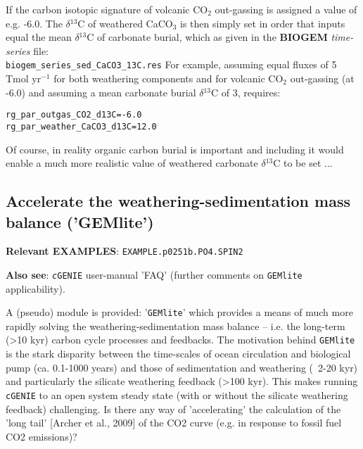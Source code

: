 \documentclass[10pt,twoside]{article}
\begin{document}
If the carbon isotopic signature of volcanic CO$_{2}$ out-gassing is assigned a value of e.g. -6.0\permil. The $\delta$$^{13}$C of weathered CaCO$_{3}$ is then simply set in order that inputs equal the mean $\delta$$^{13}$C of carbonate burial, which as given in the \textbf{BIOGEM} \textit{time-series} file:
\\\texttt{biogem\_series\_sed\_CaCO3\_13C.res}
For example, assuming equal fluxes of 5 Tmol yr$^{-1}$ for both weathering components and for volcanic CO$_{2}$ out-gassing (at -6.0\permil) and assuming a mean carbonate burial $\delta$$^{13}$C of 3\permil, requires:
\vspace{-10pt}\begin{verbatim}
rg_par_outgas_CO2_d13C=-6.0
rg_par_weather_CaCO3_d13C=12.0
\end{verbatim}\vspace{-10pt}
Of course, in reality organic carbon burial is important and including it would enable a much more realistic value of weathered carbonate $\delta$$^{13}$C to be set ...


\subsection{Accelerate the weathering-sedimentation mass balance ('GEMlite')}\label{GEMlite}

\noindent \textbf{Relevant EXAMPLES}: \texttt{EXAMPLE.p0251b.PO4.SPIN2}

\noindent \textbf{Also see}: \texttt{\textit{c}GENIE} user-manual 'FAQ' (further comments on \texttt{GEMlite} applicability).

\noindent A (pseudo) module is provided: '\texttt{GEMlite}' which provides a means of much more rapidly solving the weathering-sedimentation mass balance -- i.e. the long-term (>10 kyr) carbon cycle processes and feedbacks. The motivation behind \texttt{GEMlite} is the stark disparity between the time-scales of ocean circulation and biological pump (ca. 0.1-1000 years) and those of sedimentation and weathering (~2-20 kyr) and particularly the silicate weathering feedback (>100 kyr). This makes running \texttt{cGENIE} to an open system steady state (with or without the silicate weathering feedback) challenging. Is there any way of 'accelerating' the calculation of the 'long tail' [Archer et al., 2009] of the CO2 curve (e.g. in response to fossil fuel CO2 emissions)?
\end{document}
